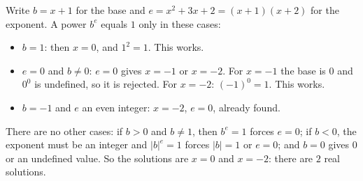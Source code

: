 Write $b=x+1$ for the base and $e=x^2+3x+2=(x+1)(x+2)$ for the exponent. A power $b^e$ equals $1$ only in these cases:
\begin{itemize}
\item $b=1$: then $x=0$, and $1^2=1$. This works.
\item $e=0$ and $b\ne0$: $e=0$ gives $x=-1$ or $x=-2$. For $x=-1$ the base is $0$ and $0^0$ is undefined, so it is rejected. For $x=-2$: $(-1)^0=1$. This works.
\item $b=-1$ and $e$ an even integer: $x=-2$, $e=0$, already found.
\end{itemize}
There are no other cases: if $b>0$ and $b\ne1$, then $b^e=1$ forces $e=0$; if $b<0$, the exponent must be an integer and $|b|^e=1$ forces $|b|=1$ or $e=0$; and $b=0$ gives $0$ or an undefined value. So the solutions are $x=0$ and $x=-2$: there are $\boxed{2}$ real solutions.
